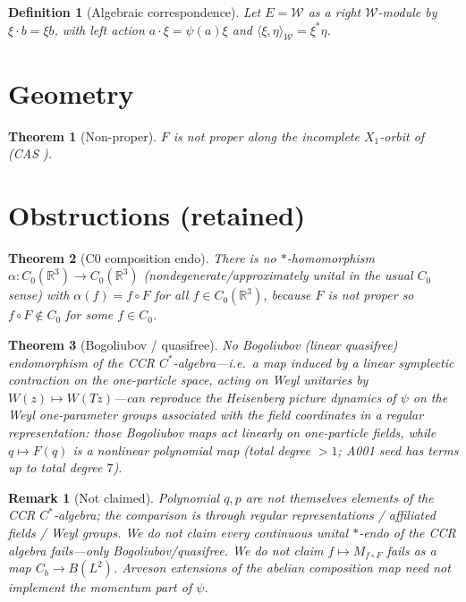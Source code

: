 \documentclass[11pt]{article}
\newcommand{\filepath}[1]{\path{#1}}
\newtheorem{theorem}{Theorem}
\newtheorem{definition}{Definition}
\newtheorem{remark}{Remark}
\begin{document}
\begin{definition}[Algebraic correspondence]
Let \(E=\mathcal{W}\) as a \emph{right} \(\mathcal{W}\)-module by \(\xi\cdot b=\xi b\),
with \emph{left} action \(a\cdot\xi=\psi(a)\xi\) and
\(\langle\xi,\eta\rangle_{\mathcal{W}}=\xi^*\eta\).
\end{definition}

\section{Geometry}
\begin{theorem}[Non-proper]
\(F\) is not proper along the incomplete \(X_1\)-orbit of~\cite{A001}
(CAS \filepath{cas_F_not_proper_C1c_A001.json}).
\end{theorem}

\section{Obstructions (retained)}
\begin{theorem}[C0 composition endo]
\label{thm:c0}
There is no \(*\)-homomorphism \(\alpha:C_0(\mathbb{R}^3)\to C_0(\mathbb{R}^3)\)
(nondegenerate/\allowbreak approximately unital in the usual \(C_0\) sense) with
\(\alpha(f)=f\circ F\) for all \(f\in C_0(\mathbb{R}^3)\), because \(F\) is not proper
so \(f\circ F\notin C_0\) for some \(f\in C_0\).
\end{theorem}

\begin{theorem}[Bogoliubov / quasifree]
No Bogoliubov (linear quasifree) endomorphism of the CCR \(C^*\)-algebra---i.e.\ a
map induced by a linear symplectic contraction on the one-particle space,
acting on Weyl unitaries by \(W(z)\mapsto W(Tz)\)---can reproduce the Heisenberg
picture dynamics of \(\psi\) on the Weyl one-parameter groups associated with the
field coordinates in a regular representation: those Bogoliubov maps act
linearly on one-particle fields, while \(q\mapsto F(q)\) is a nonlinear
polynomial map (total degree \(>1\); A001 seed has terms up to total degree \(7\)).
\end{theorem}

\begin{remark}[Not claimed]
Polynomial \(q,p\) are not themselves elements of the CCR \(C^*\)-algebra; the
comparison is through regular representations / affiliated fields / Weyl
groups. We do \emph{not} claim every continuous unital \(*\)-endo of the CCR
algebra fails---only Bogoliubov/quasifree. We do \emph{not} claim
\(f\mapsto M_{f\circ F}\) fails as a map \(C_b\to B(L^2)\). Arveson extensions of
the abelian composition map need not implement the momentum part of \(\psi\).
\end{remark}
\end{document}
